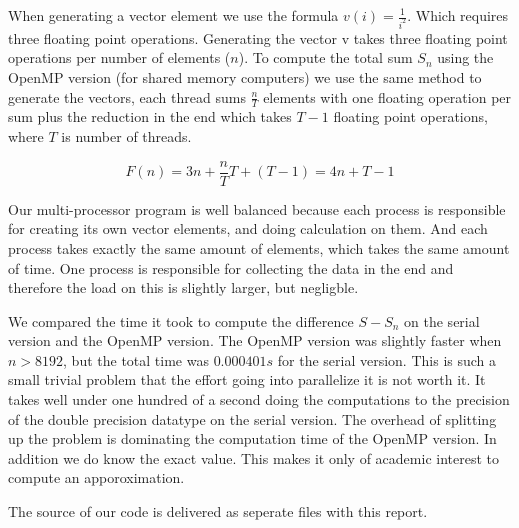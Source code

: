 \documentclass{article}
\begin{document}
    When generating a vector element we use the formula $ v(i) = \frac{1}{i^2}$. Which requires three floating point operations. Generating the vector v takes three floating point operations per number of elements ($n$). To compute the total sum $S_n$ using the OpenMP version (for shared memory computers) we use the same method to generate the vectors, each thread sums $\frac{n}{T}$ elements with one floating operation per sum plus the reduction in the end which takes $T-1$ floating point operations, where $T$ is number of threads.

    $$ F(n) = 3n + \frac{n}{T}T+(T-1) = 4n + T - 1 $$

    Our multi-processor program is well balanced because each process is responsible for creating its own vector elements, and doing calculation on them. And each process takes exactly the same amount of elements, which takes the same amount of time. One process is responsible for collecting the data in the end and therefore the load on this is slightly larger, but negligble.

    We compared the time it took to compute the difference $ S - S_n $ on the serial version and the OpenMP version. The OpenMP version was slightly faster when $n>8192$, but the total time was $0.000401s$  for the serial version. This is such a small trivial problem that the effort going into parallelize it is not worth it. It takes well under one hundred of a second doing the computations to the precision of the double precision datatype on the serial version. The overhead of splitting up the problem is dominating the computation time of the OpenMP version. In addition we do know the exact value. This makes it only of academic interest to compute an apporoximation.

    The source of our code is delivered as seperate files with this report.



\end{document}
